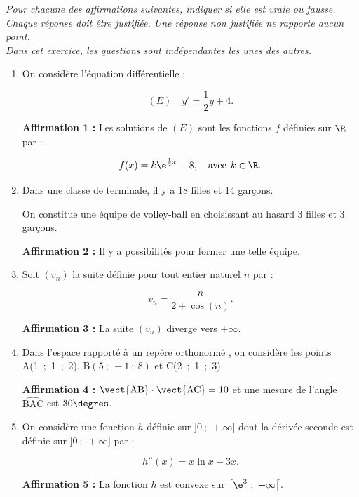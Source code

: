 \medskip

\emph{Pour chacune des affirmations suivantes, indiquer si elle est vraie ou fausse.\\
Chaque réponse doit être justifiée. Une réponse non justifiée ne rapporte aucun point.\\ Dans cet exercice, les questions sont indépendantes les unes des autres.}

\medskip

\begin{enumerate}
\item On considère l'équation différentielle :

\[(E )\quad y' = \dfrac 12y + 4.\]

\smallskip

\textbf{Affirmation 1 :} Les solutions de $(E)$ sont les fonctions $f$ définies sur $\R$ par :

\[f(x) = k\e^{\frac 12 x} - 8, \quad \text{avec}\: \: k \in \R.\]

\item Dans une classe de terminale, il y a 18 filles et 14 garçons.

On constitue une équipe de volley-ball en choisissant au hasard 3 filles et 3 garçons.

\smallskip

\textbf{Affirmation 2 :} Il y a  possibilités pour former une telle équipe.
\item Soit $(v_n)$ la suite définie pour tout entier naturel $n$ par :

\[v_n = \dfrac{n}{2 + \cos (n)}.\]

\textbf{Affirmation 3 :} La suite $(v_n)$ diverge vers $+\infty$.
\item Dans l'espace rapporté à un repère orthonormé \Oijk, on considère les points A(1~;~1~;~2),\: B$(5~;~- 1~;~8)$ et C(2~;~1~;~3).

\textbf{Affirmation 4 :} $\vect{\text{AB}} \cdot\vect{\text{AC}} = 10$ et une mesure de l'angle $\widehat{\text{BAC}}$ est $30\degres$.
\item On considère une fonction $h$ définie sur $]0~;~+ \infty]$ dont la dérivée seconde est
définie sur $]0~;~+ \infty]$ par :

\[h''(x) = x \ln x - 3x.\]

\textbf{Affirmation 5 :}  La fonction $h$ est convexe sur $\left[\e^3~;~+\infty\right[$.
\end{enumerate}
